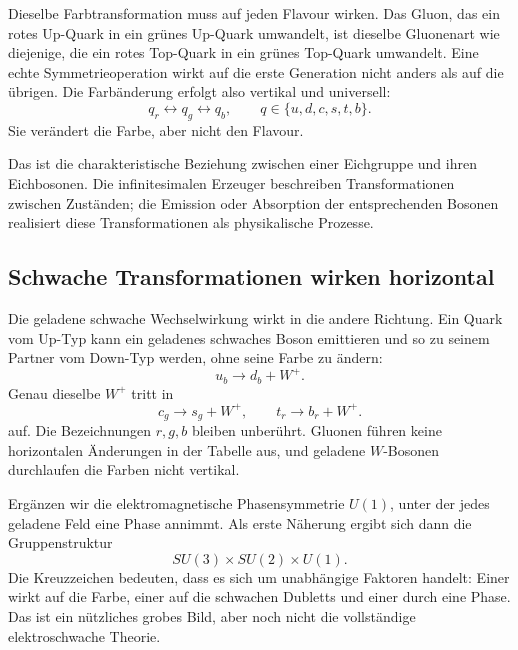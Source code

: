 Dieselbe Farbtransformation muss auf jeden Flavour wirken. Das Gluon, das ein rotes Up-Quark in ein grünes Up-Quark umwandelt, ist dieselbe Gluonenart wie diejenige, die ein rotes Top-Quark in ein grünes Top-Quark umwandelt. Eine echte Symmetrieoperation wirkt auf die erste Generation nicht anders als auf die übrigen. Die Farbänderung erfolgt also vertikal und universell:
\begin{equation}
  q_r\longleftrightarrow q_g\longleftrightarrow q_b,
  \qquad q\in\{u,d,c,s,t,b\}.
\end{equation}
Sie verändert die Farbe, aber nicht den Flavour.

Das ist die charakteristische Beziehung zwischen einer Eichgruppe und ihren Eichbosonen. Die infinitesimalen Erzeuger beschreiben Transformationen zwischen Zuständen; die Emission oder Absorption der entsprechenden Bosonen realisiert diese Transformationen als physikalische Prozesse.

\subsection{Schwache Transformationen wirken horizontal}

Die geladene schwache Wechselwirkung wirkt in die andere Richtung. Ein Quark vom Up-Typ kann ein geladenes schwaches Boson emittieren und so zu seinem Partner vom Down-Typ werden, ohne seine Farbe zu ändern:
\begin{equation}
  u_b\longrightarrow d_b+W^+.
\end{equation}
Genau dieselbe \(W^+\) tritt in
\begin{equation}
  c_g\longrightarrow s_g+W^+,
  \qquad
  t_r\longrightarrow b_r+W^+.
\end{equation}
auf. Die Bezeichnungen \(r,g,b\) bleiben unberührt. Gluonen führen keine horizontalen Änderungen in der Tabelle aus, und geladene \(W\)-Bosonen durchlaufen die Farben nicht vertikal.

Ergänzen wir die elektromagnetische Phasensymmetrie \(U(1)\), unter der jedes geladene Feld eine Phase annimmt. Als erste Näherung ergibt sich dann die Gruppenstruktur
\begin{equation}
  SU(3)\times SU(2)\times U(1).
\end{equation}
Die Kreuzzeichen bedeuten, dass es sich um unabhängige Faktoren handelt: Einer wirkt auf die Farbe, einer auf die schwachen Dubletts und einer durch eine Phase. Das ist ein nützliches grobes Bild, aber noch nicht die vollständige elektroschwache Theorie.

